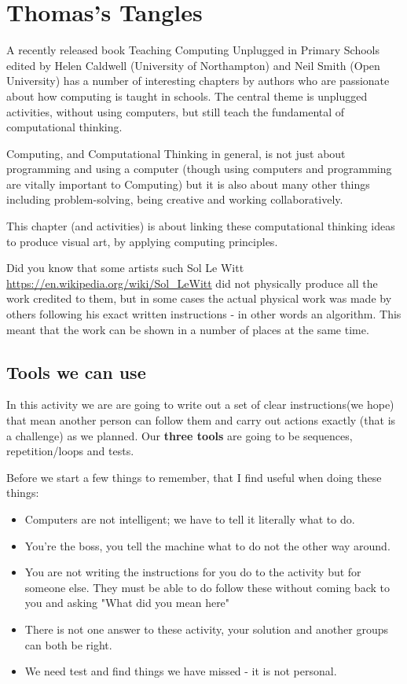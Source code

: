 
\chapter{Thomas's Tangles}
A recently released book Teaching Computing Unplugged in Primary Schools  edited by Helen Caldwell (University of Northampton) and Neil Smith (Open University) has a number of interesting chapters by authors who are passionate about how computing is taught in schools. The central theme is unplugged activities, without using computers, but still teach the fundamental of computational thinking.

Computing, and Computational Thinking in general,  is not just about programming and using a computer (though using computers and  programming are vitally important to Computing) but it is also about many other things including problem-solving, being creative and working collaboratively.

This chapter (and activities) is about linking these computational thinking ideas to produce visual art, by applying computing principles. 

Did you know that some artists such Sol Le Witt \url{https://en.wikipedia.org/wiki/Sol_LeWitt} did not physically produce all the work credited to them, but in some cases the actual physical work was made by others following his exact written instructions - in other words an algorithm. This meant that the work can be shown in a number of places at the same time.

\section{Tools we can use}

In this activity we are are going to write out a set of clear instructions(we hope) that mean another person can follow them and carry out actions exactly (that is a challenge) as we planned. Our \textbf{three tools} are going to be sequences, repetition/loops and tests.

Before we start a few things to remember, that I find useful when doing these things:
\begin{itemize}
    \item Computers are not intelligent; we have to tell it literally what to do.
    \item You're the boss, you tell the machine what to do not the other way around.
    \item You are not writing the instructions for you do to the activity but for someone else. They must be able to do follow these without coming back to you and asking "What did you mean here"
    \item There is not one answer to these activity, your solution and another groups can both be right.  
    \item We need test and find things we have missed - it is not personal.
\end{itemize}

